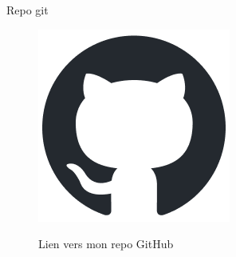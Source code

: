 \documentclass[aspectratio=43,8pt]{beamer}
\begin{document}
\begin{frame}[noframenumbering]{Repo git}
\begin{figure}[h]
    \centering
    \href{https://github.com/BJCode-git/ODB-C}{%
        \includegraphics[scale=1]{img2/github-mark.png}%
    }
    \caption{Lien vers mon repo GitHub}
    \label{fig:github}
\end{figure}
\end{frame}
\end{document}
